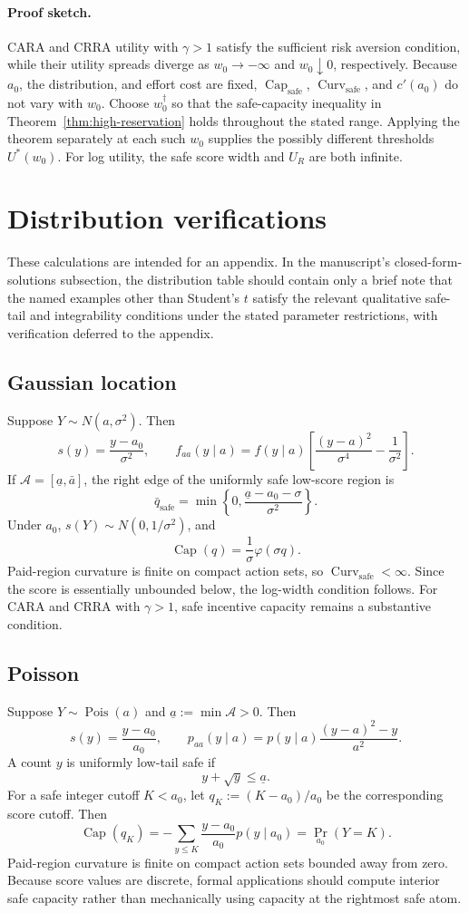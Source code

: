 \documentclass[11pt]{article}
\theoremstyle{remark}
\newcommand{\cA}{\mathcal A}
\DeclareMathOperator{\Capacity}{Cap}
\DeclareMathOperator{\Curv}{Curv}
\newcommand{\proofsketch}{\paragraph{Proof sketch.}}
\begin{document}
\proofsketch
CARA and CRRA utility with $\gamma>1$ satisfy the sufficient risk aversion
condition, while their
utility spreads diverge as $w_0\to-\infty$ and $w_0\downarrow0$, respectively.
Because $a_0$, the distribution, and effort cost are fixed,
$\Capacity_{\mathrm{safe}}$, $\Curv_{\mathrm{safe}}$, and $c'(a_0)$ do not vary
with $w_0$.  Choose $w_0^\dagger$ so that the safe-capacity inequality in
Theorem~\ref{thm:high-reservation} holds throughout the stated range.  Applying
the theorem separately at each such $w_0$ supplies the possibly different
thresholds $U^*(w_0)$.  For log utility, the safe score width and $U_R$ are both
infinite.

\section{Distribution verifications}

These calculations are intended for an appendix.  In the manuscript's
closed-form-solutions subsection, the distribution table should contain only a
brief note that the named examples other than Student's $t$ satisfy the relevant
qualitative safe-tail and integrability conditions under the stated parameter
restrictions, with verification deferred to the appendix.

\subsection{Gaussian location}

Suppose $Y\sim N(a,\sigma^2)$.  Then
\[
 s(y)=\frac{y-a_0}{\sigma^2},
 \qquad
 f_{aa}(y\mid a)=f(y\mid a)
 \left[\frac{(y-a)^2}{\sigma^4}-\frac1{\sigma^2}\right].
\]
If $\cA=[\underline a,\bar a]$, the right edge of the uniformly safe low-score
region is
\[
 \bar q_{\mathrm{safe}}
 =\min\left\{0,\frac{\underline a-a_0-\sigma}{\sigma^2}\right\}.
\]
Under $a_0$, $s(Y)\sim N(0,1/\sigma^2)$, and
\[
 \Capacity(q)=\frac1\sigma\varphi(\sigma q).
\]
Paid-region curvature is finite on compact action sets, so
$\Curv_{\mathrm{safe}}<\infty$.  Since the score is essentially unbounded below, the log-width
condition follows.  For CARA and CRRA with $\gamma>1$, safe incentive capacity
remains a substantive condition.

\subsection{Poisson}

Suppose $Y\sim\operatorname{Pois}(a)$ and $\underline a:=\min\cA>0$.  Then
\[
 s(y)=\frac{y-a_0}{a_0},
 \qquad
 p_{aa}(y\mid a)=p(y\mid a)\frac{(y-a)^2-y}{a^2}.
\]
A count $y$ is uniformly low-tail safe if
\[
 y+\sqrt y\le\underline a.
\]
For a safe integer cutoff $K<a_0$, let $q_K:=(K-a_0)/a_0$ be the
corresponding score cutoff.  Then
\[
 \Capacity(q_K)
 =-\sum_{y\le K}\frac{y-a_0}{a_0}p(y\mid a_0)
 =\Pr_{a_0}(Y=K).
\]
Paid-region curvature is finite on compact action sets bounded away from zero.
Because score values are discrete, formal applications should compute interior
safe capacity rather than mechanically using capacity at the rightmost safe
atom.
\end{document}
